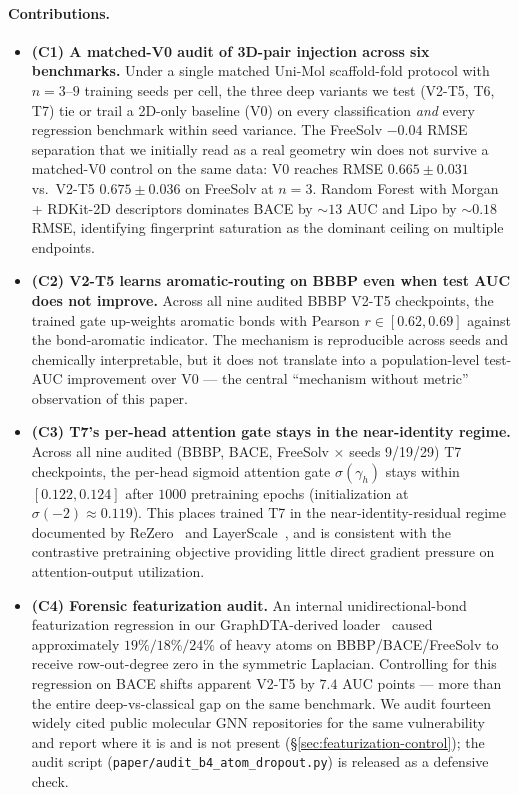 \paragraph{Contributions.}
\begin{itemize}
\item \textbf{(C1) A matched-V0 audit of 3D-pair injection across six
benchmarks.} Under a single matched Uni-Mol scaffold-fold protocol with
$n{=}3$--$9$ training seeds per cell, the three deep variants we test
(V2-T5, T6, T7) tie or trail a 2D-only baseline (V0) on every
classification \emph{and} every regression benchmark within seed
variance. The FreeSolv $-0.04$ RMSE separation that we initially read as
a real geometry win does not survive a matched-V0 control on the same
data: V0 reaches RMSE $0.665 \pm 0.031$ vs.\ V2-T5
$0.675 \pm 0.036$ on FreeSolv at $n{=}3$. Random Forest with Morgan +
RDKit-2D descriptors dominates BACE by $\sim 13$ AUC and Lipo by
$\sim 0.18$ RMSE, identifying fingerprint saturation as the dominant
ceiling on multiple endpoints.

\item \textbf{(C2) V2-T5 learns aromatic-routing on BBBP even when test
AUC does not improve.} Across all nine audited BBBP V2-T5 checkpoints,
the trained gate up-weights aromatic bonds with Pearson
$r \in [0.62, 0.69]$ against the bond-aromatic indicator. The mechanism
is reproducible across seeds and chemically interpretable, but it does
not translate into a population-level test-AUC improvement over V0 ---
the central ``mechanism without metric'' observation of this paper.

\item \textbf{(C3) T7's per-head attention gate stays in the
near-identity regime.} Across all nine audited (BBBP, BACE, FreeSolv
$\times$ seeds 9/19/29) T7 checkpoints, the per-head sigmoid attention
gate $\sigma(\gamma_h)$ stays within $[0.122, 0.124]$ after $1000$
pretraining epochs (initialization at $\sigma({-}2)\approx 0.119$). This
places trained T7 in the near-identity-residual regime documented by
ReZero~\cite{bachlechner2021rezero} and
LayerScale~\cite{touvron2021cait}, and is consistent with the
contrastive pretraining objective providing little direct gradient
pressure on attention-output utilization.

\item \textbf{(C4) Forensic featurization audit.} An internal
unidirectional-bond featurization regression in our GraphDTA-derived
loader~\cite{nguyen2021graphdta} caused approximately $19\%/18\%/24\%$
of heavy atoms on BBBP/BACE/FreeSolv to receive row-out-degree zero in
the symmetric Laplacian. Controlling for this regression on BACE
shifts apparent V2-T5 by $7.4$ AUC points --- more than the entire
deep-vs-classical gap on the same benchmark. We audit fourteen widely
cited public molecular GNN repositories for the same vulnerability and
report where it is and is not present
(\S\ref{sec:featurization-control}); the audit script
(\texttt{paper/audit\_b4\_atom\_dropout.py}) is released as a
defensive check.


\end{itemize}
